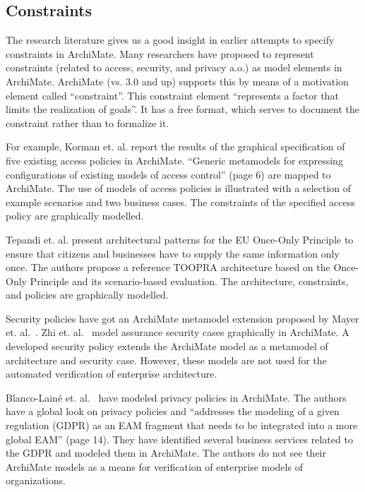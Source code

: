 \documentclass[sn-vancouver]{sn-jnl}%
\begin{document}
\subsection{Constraints}\label{Constraints}
The research literature gives us a good insight in earlier attempts to specify constraints in ArchiMate.
Many researchers have proposed to represent constraints (related to access, security, and privacy a.o.) as model elements in ArchiMate.
ArchiMate (vs. 3.0 and up) supports this by means of a motivation element called ``constraint''.
This constraint element ``represents a factor that limits the realization of goals''\cite{ArchiMate}.
It has a free format, which serves to document the constraint rather than to formalize it.

For example,
Korman et. al.\cite{korman2016modeling} report the results of the graphical specification of five existing access policies in ArchiMate.
``Generic metamodels for expressing configurations of existing models of access control'' (page 6) are mapped to ArchiMate.
The use of models of access policies is illustrated with a selection of example scenarios and two business cases.
The constraints of the specified access policy are graphically modelled.

Tepandi et. al.\cite{tepandi2019towards} present architectural patterns for the EU Once-Only Principle
to ensure that citizens and businesses have to supply the same information only once.
The authors propose a reference TOOPRA architecture based on the Once-Only Principle and its scenario-based evaluation.
The architecture, constraints, and policies are graphically modelled.

Security policies have got an ArchiMate metamodel extension proposed by Mayer et. al.~\cite{mayer2019integrated}.
Zhi et. al.~\cite{zhi2018imsa} model assurance security cases graphically in ArchiMate.
A developed security policy extends the ArchiMate model as a metamodel of architecture and security case.
However, these models are not used for the automated verification of enterprise architecture.

Blanco-Lain\'e et. al.~\cite{blanco2019using} have modeled privacy policies in ArchiMate.
The authors have a global look on privacy policies and
``addresses the modeling of a given regulation (GDPR) as an EAM fragment that needs to be integrated into a more global EAM'' (page 14).
They have identified several business services related to the GDPR and modeled them in ArchiMate.
The authors do not see their ArchiMate models as a means for verification of enterprise models of organizations.
\end{document}
